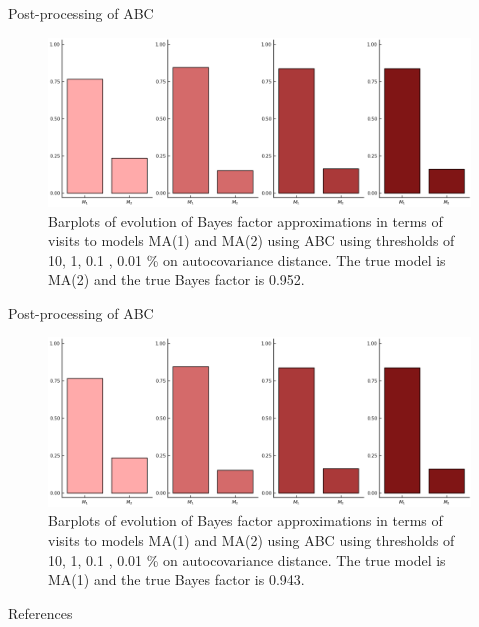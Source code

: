 \documentclass[10pt]{beamer}
\begin{document}
\begin{frame}[fragile]{Post-processing of ABC}

    \begin{figure}[H]
        \centering
        \includegraphics[width=11.2cm]{images/ModelChoice_MA2.png}
        \caption{Barplots of evolution of Bayes factor approximations
        in terms of visits to models MA(1) and MA(2) using
        ABC using thresholds of 10, 1, 0.1 , 0.01 \% on autocovariance
        distance. The true model is MA(2) and the true Bayes factor is 0.952.
        }
    \end{figure}

\end{frame}

\begin{frame}[fragile]{Post-processing of ABC}

    \begin{figure}[H]
        \centering
        \includegraphics[width=11.2cm]{images/ModelChoice_MA1.png}
        \caption{Barplots of evolution of Bayes factor approximations
        in terms of visits to models MA(1) and MA(2) using
        ABC using thresholds of 10, 1, 0.1 , 0.01 \% on autocovariance
        distance. The true model is MA(1) and the true Bayes factor is 0.943.
        }
    \end{figure}

\end{frame}

\begin{frame}[allowframebreaks]{References}

  \renewcommand{\section}[2]{}%
  
  

\end{frame}
\end{document}
